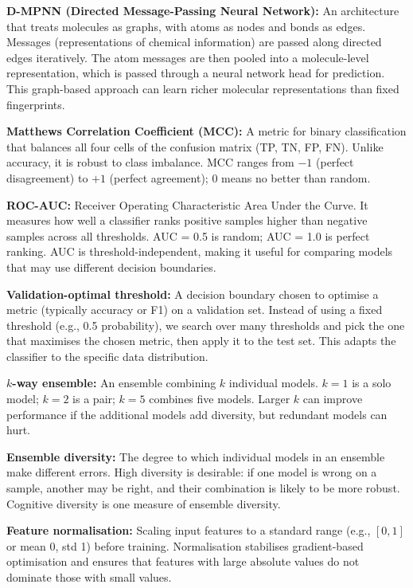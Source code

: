 \documentclass[11pt,a4paper]{article}
\begin{document}
\noindent\textbf{D-MPNN (Directed Message-Passing Neural Network):} An
architecture that treats molecules as graphs, with atoms as nodes and bonds
as edges. Messages (representations of chemical information) are passed along
directed edges iteratively. The atom messages are then pooled into a molecule-level
representation, which is passed through a neural network head for prediction.
This graph-based approach can learn richer molecular representations than
fixed fingerprints.

\noindent\textbf{Matthews Correlation Coefficient (MCC):} A metric for binary
classification that balances all four cells of the confusion matrix (TP, TN, FP, FN).
Unlike accuracy, it is robust to class imbalance. MCC ranges from $-1$
(perfect disagreement) to $+1$ (perfect agreement); $0$ means no better than
random.

\noindent\textbf{ROC-AUC:} Receiver Operating Characteristic Area Under the Curve.
It measures how well a classifier ranks positive samples higher than negative
samples across all thresholds. AUC = 0.5 is random; AUC = 1.0 is perfect
ranking. AUC is threshold-independent, making it useful for comparing models
that may use different decision boundaries.

\noindent\textbf{Validation-optimal threshold:} A decision boundary chosen to
optimise a metric (typically accuracy or F1) on a validation set. Instead of
using a fixed threshold (e.g., 0.5 probability), we search over many thresholds
and pick the one that maximises the chosen metric, then apply it to the test set.
This adapts the classifier to the specific data distribution.

\noindent\textbf{$k$-way ensemble:} An ensemble combining $k$ individual models.
$k=1$ is a solo model; $k=2$ is a pair; $k=5$ combines five models. Larger $k$
can improve performance if the additional models add diversity, but redundant
models can hurt.

\noindent\textbf{Ensemble diversity:} The degree to which individual models in
an ensemble make different errors. High diversity is desirable: if one model
is wrong on a sample, another may be right, and their combination is likely to
be more robust. Cognitive diversity is one measure of ensemble diversity.

\noindent\textbf{Feature normalisation:} Scaling input features to a standard
range (e.g., $[0, 1]$ or mean 0, std 1) before training. Normalisation
stabilises gradient-based optimisation and ensures that features with large
absolute values do not dominate those with small values.
\end{document}
